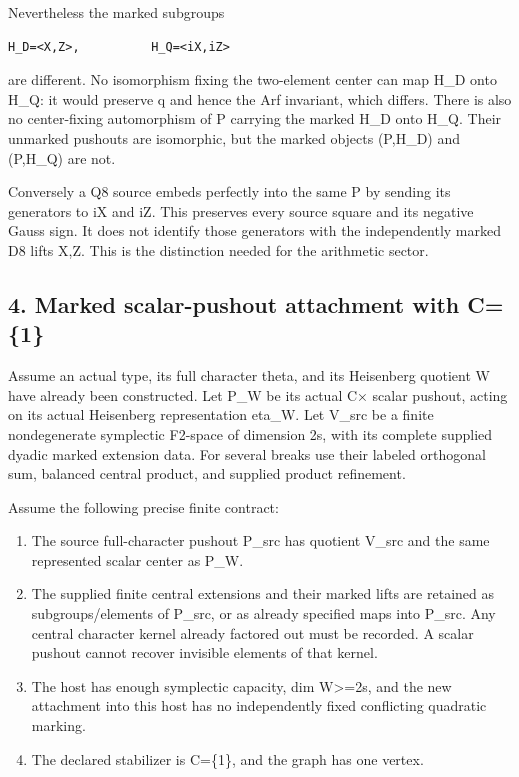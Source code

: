 Nevertheless the marked subgroups

\begin{Verbatim}[fontsize=\small,breaklines=true,breakanywhere=true]
H_D=<X,Z>,          H_Q=<iX,iZ>
\end{Verbatim}

are different. No isomorphism fixing the two-element center can map H\_D
onto H\_Q: it would preserve q and hence the Arf invariant, which
differs. There is also no center-fixing automorphism of P carrying the
marked H\_D onto H\_Q. Their unmarked pushouts are isomorphic, but the
marked objects (P,H\_D) and (P,H\_Q) are not.

Conversely a Q8 source embeds perfectly into the same P by sending its
generators to iX and iZ. This preserves every source square and its
negative Gauss sign. It does not identify those generators with the
independently marked D8 lifts X,Z. This is the distinction needed for
the arithmetic sector.

\hypertarget{dyadic_markings-marked-scalar-pushout-attachment-with-c1}{%
\subsection{4. Marked scalar-pushout attachment with
C=\{1\}}\label{dyadic_markings-marked-scalar-pushout-attachment-with-c1}}

Assume an actual type, its full character theta, and its Heisenberg
quotient W have already been constructed. Let P\_W be its actual C×
scalar pushout, acting on its actual Heisenberg representation eta\_W.
Let V\_src be a finite nondegenerate symplectic F2-space of dimension 2s,
with its complete supplied dyadic marked extension data. For several
breaks use their labeled orthogonal sum, balanced central product, and
supplied product refinement.

Assume the following precise finite contract:

\begin{enumerate}
\def\labelenumi{\arabic{enumi}.}
\tightlist
\item
  The source full-character pushout P\_src has quotient V\_src and the
  same represented scalar center as P\_W.
\item
  The supplied finite central extensions and their marked lifts are
  retained as subgroups/elements of P\_src, or as already specified maps
  into P\_src. Any central character kernel already factored out must be recorded. A scalar pushout cannot recover invisible elements of that
  kernel.
\item
  The host has enough symplectic capacity, dim W\textgreater=2s, and the
  new attachment into this host has no independently fixed conflicting
  quadratic marking.
\item
  The declared stabilizer is C=\{1\}, and the graph has one vertex.
\end{enumerate}


